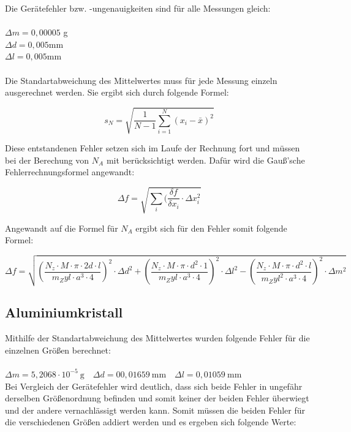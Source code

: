 \documentclass[12pt,a4paper,titlepage,headinclude,bibtotoc]{scrartcl}
\begin{document}
Die Gerätefehler bzw. -ungenauigkeiten sind für alle Messungen gleich:
\\
\\
$\Delta m = 0,00005$ g \\
$\Delta d = 0,005$mm\\
$\Delta l = 0,005 $mm\\
\\

Die Standartabweichung des Mittelwertes muss für jede Messung einzeln ausgerechnet werden. Sie ergibt sich durch folgende Formel:

\begin{equation}
s_N=\sqrt{\frac{1}{N-1}\sum_{i=1}^N (x_i -\bar{x})^2}
\end{equation}

Diese entstandenen Fehler setzen sich im Laufe der Rechnung fort und müssen bei der Berechung von $N_A$ mit berücksichtigt werden. Dafür wird die Gauß'sche Fehlerrechnungsformel angewandt:

\begin{equation}
\Delta f =\sqrt{\sum_{i}(\frac{\delta f}{\delta x_i}\cdot\Delta x^2_i}
\end{equation}

Angewandt auf die Formel für $N_A$ ergibt sich für den Fehler somit folgende Formel:

\begin{equation}
\Delta f = \sqrt{\left(\frac{N_z \cdot M \cdot \pi \cdot 2d \cdot l}{m_Zyl \cdot a^3 \cdot 4}\right)^2 \cdot \Delta d^2 + \left(\frac{N_z \cdot M \cdot \pi \cdot d^2 \cdot 1}{m_Zyl \cdot a^3 \cdot 4}\right)^2 \cdot \Delta l^2 - \left(\frac{N_z \cdot M \cdot \pi \cdot d^2 \cdot l}{m_Zyl^2 \cdot a^3 \cdot 4}\right)^2 \cdot \Delta m^2}
\end{equation}

\subsection{Aluminiumkristall}
 
Mithilfe der Standartabweichung des Mittelwertes wurden folgende Fehler für die einzelnen Größen berechnet:
\\
\\
$\Delta m = 5,2068\cdot10^{-5} \ \mathrm{g} \quad \Delta d= 00,01659 \ \mathrm{mm} \quad \Delta l = 0,01059\ \mathrm{mm}$\\

\vspace{3mm}
Bei Vergleich der Gerätefehler wird deutlich, dass sich beide Fehler in ungefähr derselben Größenordnung befinden und somit keiner der beiden Fehler überwiegt und der andere vernachlässigt werden kann. Somit müssen die beiden Fehler für die verschiedenen Größen addiert werden und es ergeben sich folgende Werte:
\end{document}
